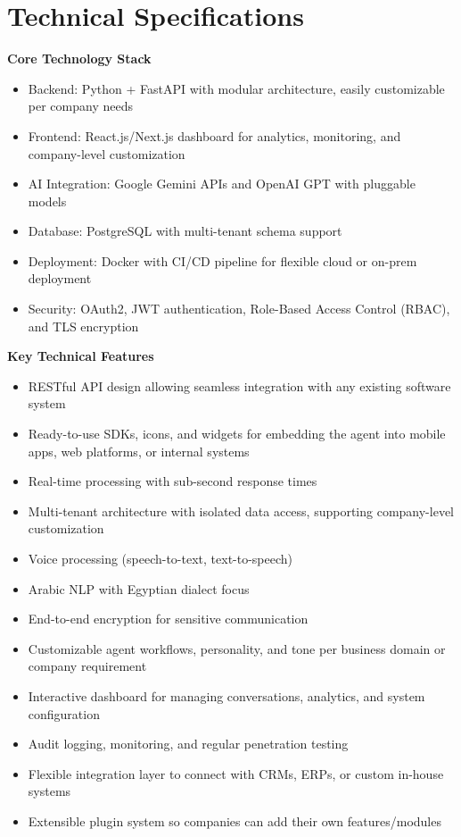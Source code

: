 \documentclass[12pt,a4paper]{article}
\begin{document}
\section*{Technical Specifications}

\textbf{Core Technology Stack}
\begin{itemize}
    \item Backend: Python + FastAPI with modular architecture, easily customizable per company needs
    \item Frontend: React.js/Next.js dashboard for analytics, monitoring, and company-level customization
    \item AI Integration: Google Gemini APIs and OpenAI GPT with pluggable models
    \item Database: PostgreSQL with multi-tenant schema support
    \item Deployment: Docker with CI/CD pipeline for flexible cloud or on-prem deployment
    \item Security: OAuth2, JWT authentication, Role-Based Access Control (RBAC), and TLS encryption
\end{itemize}

\textbf{Key Technical Features}
\begin{itemize}
    \item RESTful API design allowing seamless integration with any existing software system
    \item Ready-to-use SDKs, icons, and widgets for embedding the agent into mobile apps, web platforms, or internal systems
    \item Real-time processing with sub-second response times
    \item Multi-tenant architecture with isolated data access, supporting company-level customization
    \item Voice processing (speech-to-text, text-to-speech)
    \item Arabic NLP with Egyptian dialect focus
    \item End-to-end encryption for sensitive communication
    \item Customizable agent workflows, personality, and tone per business domain or company requirement
    \item Interactive dashboard for managing conversations, analytics, and system configuration
    \item Audit logging, monitoring, and regular penetration testing
    \item Flexible integration layer to connect with CRMs, ERPs, or custom in-house systems
    \item Extensible plugin system so companies can add their own features/modules
\end{itemize}
\end{document}

